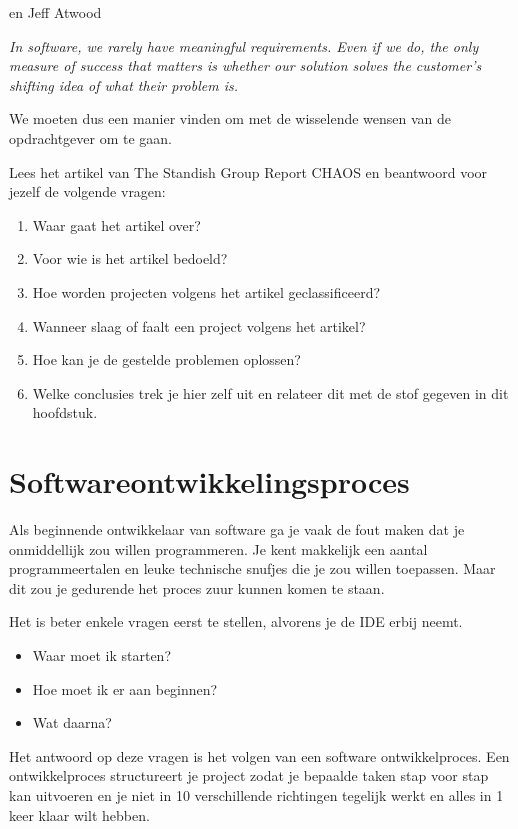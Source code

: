 en Jeff Atwood
\begin{center}
\textit{In software, we rarely have meaningful requirements.  Even if we do, the only measure of success that matters is whether our solution solves the customer's shifting idea of what their problem is.}
\end{center}

We moeten dus een manier vinden om met de wisselende wensen van de opdrachtgever om te gaan.

\begin{exercise}
	Lees het artikel van The Standish Group Report CHAOS en beantwoord voor jezelf de volgende vragen:
	
	\begin{enumerate}
		\item Waar gaat het artikel over?
		\item Voor wie is het artikel bedoeld?
		\item Hoe worden projecten volgens het artikel geclassificeerd?
		\item Wanneer slaag of faalt een project volgens het artikel?
		\item Hoe kan je de gestelde problemen oplossen?
		\item Welke conclusies trek je hier zelf uit en relateer dit met de stof gegeven in dit hoofdstuk.
	\end{enumerate}
\end{exercise}


\section{Softwareontwikkelingsproces}
Als beginnende ontwikkelaar van software ga je vaak de fout maken dat je onmiddellijk zou willen programmeren. Je kent makkelijk een aantal programmeertalen en leuke technische snufjes die je zou willen toepassen. Maar dit zou je gedurende het proces zuur kunnen komen te staan. 

Het is beter enkele vragen eerst te stellen, alvorens je de IDE erbij neemt.
\begin{itemize}
	\item Waar moet ik starten?
	\item Hoe moet ik er aan beginnen?
	\item Wat daarna?
\end{itemize}

Het antwoord op deze vragen is het volgen van een software ontwikkelproces. Een ontwikkelproces structureert je project zodat je bepaalde taken stap voor stap kan uitvoeren en je niet in 10 verschillende richtingen tegelijk werkt en alles in 1 keer klaar wilt hebben.

